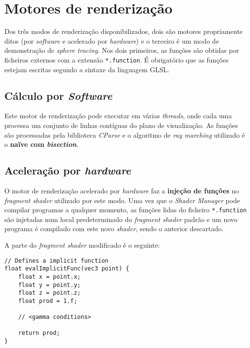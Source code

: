 \section{Motores de renderização}
\label{sec::impl:motor}

Dos três modos de renderização disponibilizados, dois são motores propriamente ditos (por \textit{software} e acelerado por \textit{hardware}) e o terceiro é um modo de demonstração de \textit{sphere tracing}. Nos dois primeiros, as funções são obtidas por ficheiros externos com a extensão \verb|*.function|. É obrigatório que as funções estejam escritas segundo a sintaxe da linguagem \ac{GLSL}.


\subsection{Cálculo por \textit{Software}}
\label{ssec::impl:motor:cpu}

Este motor de renderização pode executar em várias \textit{threads}, onde cada uma processa um conjunto de linhas contíguas do plano de visualização. As funções são processadas pela biblioteca \textit{CParse} e o algoritmo de \textit{ray marching} utilizado é o \textbf{naïve com \textit{bisection}}.


\subsection{Aceleração por \textit{hardware}}
\label{ssec::impl:motor:gpu}

O motor de renderização acelerado por \textit{hardware} faz a \textbf{injeção de funções} no \textit{fragment shader} utilizado por este modo. Uma vez que o \textit{Shader Manager} pode compilar programas a qualquer momento, as funções lidas do ficheiro \verb|*.function| são injetadas num local predeterminado do \textit{fragment shader} padrão e um novo programa é compilado com este novo \textit{shader}, sendo o anterior descartado.

A parte do \textit{fragment shader} modificado é o seguinte:

\begin{verbatim}
// Defines a implicit function
float evalImplicitFunc(vec3 point) {
    float x = point.x;
    float y = point.y;
    float z = point.z;
    float prod = 1.f;

    // <gamma conditions>

    return prod;
}
\end{verbatim}

